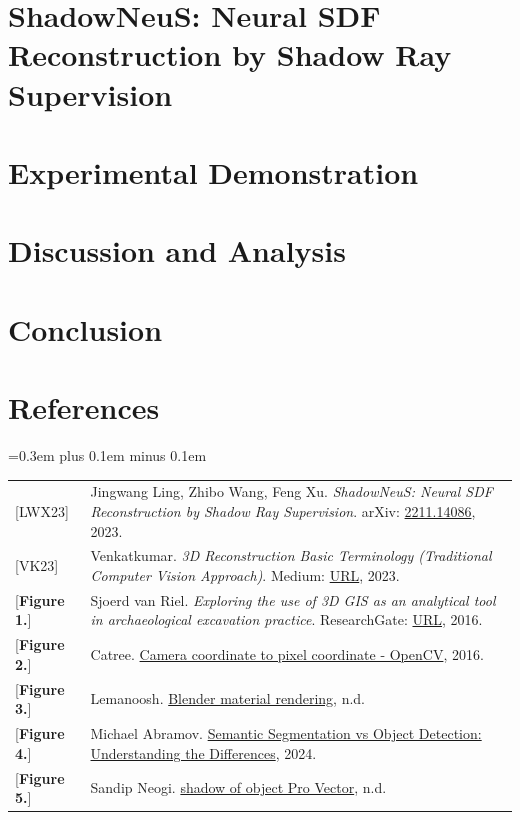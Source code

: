 \documentclass[12pt,a4paper]{article}
\theoremstyle{definition}
\begin{document}
\section{ShadowNeuS: Neural SDF Reconstruction by Shadow Ray Supervision}

\section{Experimental Demonstration}

\section{Discussion and Analysis}

\section{Conclusion}


\section*{References}
\spaceskip=0.3em plus 0.1em minus 0.1em
\begin{tabular}{p{}p{}}
{[LWX23]}               & Jingwang Ling, Zhibo Wang, Feng Xu. \textit{ShadowNeuS: Neural SDF Reconstruction by Shadow Ray Supervision}. arXiv: \href{https://arxiv.org/abs/2211.14086}{2211.14086}, 2023. \hypertarget{[LWX23]}{}  \\
{[VK23]}                & Venkatkumar. \textit{3D Reconstruction Basic Terminology (Traditional Computer Vision Approach)}. Medium: \href{https://medium.com/@VK_Venkatkumar/3d-reconstruction-basic-terminology-traditional-computer-vision-e148496f389}{URL}, 2023. \hypertarget{[VK23]}{} \\
{[\textbf{Figure 1.}]}  & Sjoerd van Riel. \textit{Exploring the use of 3D GIS as an analytical tool in archaeological excavation practice}. ResearchGate: \href{https://www.researchgate.net/figure/Structure-from-Motion-SfM-photogrammetric-principle-Source-Theia-sfmorg-2016_fig3_303824023}{URL}, 2016. \hypertarget{[Fig 1]}{} \\
{[\textbf{Figure 2.}]}  & Catree. \href{https://stackoverflow.com/questions/38494485/camera-coordinate-to-pixel-coordinate-opencv}{Camera coordinate to pixel coordinate - OpenCV}, 2016. \hypertarget{[Fig 2]}{} \\
{[\textbf{Figure 3.}]}  & Lemanoosh. \href{https://lemanoosh.com/online-course-blender-material-rendering/}{Blender material rendering}, n.d. \hypertarget{[Fig 3]}{}  \\
{[\textbf{Figure 4.}]}  & Michael Abramov. \href{https://keymakr.com/blog/semantic-segmentation-vs-object-detection-understanding-the-differences/}{Semantic Segmentation vs Object Detection: Understanding the Differences}, 2024. \hypertarget{[Fig 4]}{}  \\
{[\textbf{Figure 5.}]}  & Sandip Neogi. \href{https://www.vecteezy.com/vector-art/42399612-shadow-of-object}{shadow of object Pro Vector}, n.d. \hypertarget{[Fig 5]}{}  \\
\end{tabular}
\end{document}
